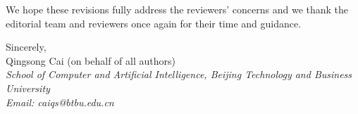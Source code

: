 \documentclass[11pt]{article}
\begin{document}
\vspace{0.6em}
We hope these revisions fully address the reviewers' concerns and we thank the
editorial team and reviewers once again for their time and guidance.

\vspace{0.8em}
Sincerely,\\
Qingsong Cai (on behalf of all authors)\\
\textit{School of Computer and Artificial Intelligence, Beijing Technology and
Business University}\\
\textit{Email: caiqs@btbu.edu.cn}
\end{document}
